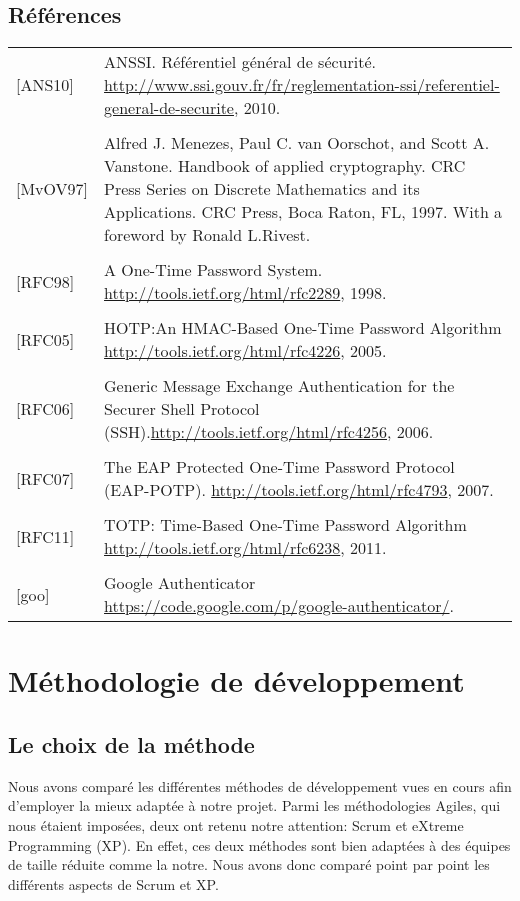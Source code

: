 \documentclass{../../res/univ-projet}
\begin{document}
\subsection{Références} 
	\begin{tabular}{p{}>{\raggedright\arraybackslash}p{13cm}}
		{[ANS10]} & {ANSSI. Référentiel général de sécurité. \href{http://www.ssi.gouv.fr/fr/reglementation-ssi/referentiel-general-de-securite}{http://www.ssi.gouv.fr/fr/reglementation-ssi/referentiel-general-de-securite}, 2010.}
		\tabularnewline
		\\
		{[MvOV97]} & {Alfred J. Menezes, Paul C. van Oorschot, and Scott A. Vanstone. Handbook of applied cryptography. CRC Press Series on Discrete Mathematics and its Applications. CRC Press, Boca Raton, FL, 1997. With a foreword by Ronald L.Rivest.}
		\tabularnewline
		\\
		{[RFC98]} & {A One-Time Password System. \href{http://tools.ietf.org/html/rfc2289}{http://tools.ietf.org/html/rfc2289}, 1998.}
		\tabularnewline
		\\
		{[RFC05]} & {HOTP:An HMAC-Based One-Time Password Algorithm \href{http://tools.ietf.org/html/rfc4226}{http://tools.ietf.org/html/rfc4226}, 2005.}
		\tabularnewline
		\\
		{[RFC06]} & {Generic Message Exchange Authentication for the Securer Shell Protocol (SSH).\href{http://tools.ietf.org/html/rfc4256}{http://tools.ietf.org/html/rfc4256}, 2006.}
		\tabularnewline
		\\
		{[RFC07]} & {The EAP Protected One-Time Password Protocol (EAP-POTP). \href{http://tools.ietf.org/html/rfc4793}{http://tools.ietf.org/html/rfc4793}, 2007.}
		\tabularnewline
		\\
		{[RFC11]} & {TOTP: Time-Based One-Time Password Algorithm \href{http://tools.ietf.org/html/rfc6238}{http://tools.ietf.org/html/rfc6238}, 2011.}
		\tabularnewline
		\\
		{[goo]} & {Google Authenticator \href{https://code.google.com/p/google-authenticator/}{https://code.google.com/p/google-authenticator/}.}
	\end{tabular}
	
\newpage
\section{Méthodologie de développement}
\subsection{Le choix de la méthode}
	Nous avons comparé les différentes méthodes de développement vues en cours afin d'employer la mieux adaptée à notre projet. Parmi les méthodologies Agiles, qui nous étaient imposées, deux ont retenu notre attention: Scrum et eXtreme Programming (XP). En effet, ces deux méthodes sont bien adaptées à des équipes de taille réduite comme la notre. Nous avons donc comparé point par point les différents aspects de Scrum et XP.\\
\end{document}
